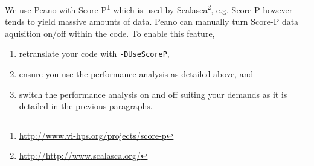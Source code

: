 We use Peano with Score-P\footnote{\url{http://www.vi-hps.org/projects/score-p}}
which is used by Scalasca\footnote{\url{http://http://www.scalasca.org/}}, e.g.
Score-P however tends to yield massive amounts of data. 
Peano can manually turn Score-P data aquisition on/off within the code. 
To enable this feature,
\begin{enumerate}
  \item retranslate your code with \texttt{-DUseScoreP},
  \item ensure you use the performance analysis as detailed above, and
  \item switch the performance analysis on and off suiting your demands as it is
  detailed in the previous paragraphs.
\end{enumerate}




